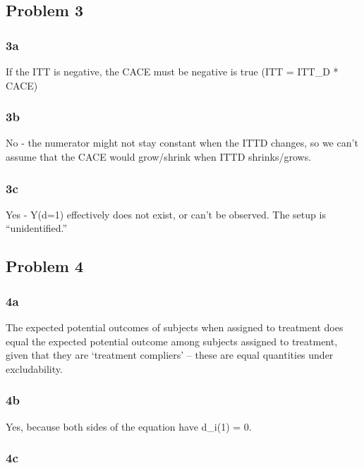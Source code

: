 \documentclass[
]{article}
\begin{document}
\subsection{Problem 3}\label{problem-3}

\subsubsection{3a}\label{a}

If the ITT is negative, the CACE must be negative is true (ITT = ITT\_D
* CACE)

\subsubsection{3b}\label{b}

No - the numerator might not stay constant when the ITTD changes, so we
can't assume that the CACE would grow/shrink when ITTD shrinks/grows.

\subsubsection{3c}\label{c}

Yes - Y(d=1) effectively does not exist, or can't be observed. The setup
is ``unidentified.''

\subsection{Problem 4}\label{problem-4}

\subsubsection{4a}\label{a-1}

The expected potential outcomes of subjects when assigned to treatment
does equal the expected potential outcome among subjects assigned to
treatment, given that they are `treatment compliers' -- these are equal
quantities under excludability.

\subsubsection{4b}\label{b-1}

Yes, because both sides of the equation have d\_i(1) = 0.

\subsubsection{4c}\label{c-1}
\end{document}
